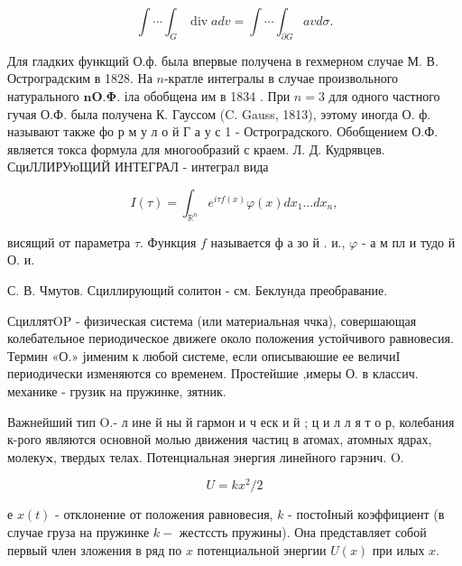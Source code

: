 \documentclass[10pt]{article}
\begin{document}
\[

\int \cdots \int_{G} \operatorname{div} a d v=\int \cdots \int_{\partial G} a v d \sigma .

\]



Для гладких функщий О.ф. была впервые получена в гехмерном случае М. В. Остроградским в 1828. На $n$-кратле интегралы в случае произвольного натурального $\boldsymbol{n} \mathbf{O} . \boldsymbol{\Phi}$. іла обобщена им в 1834 . При $n=3$ для одного частного гучая О.Ф. была получена К. Гауссом (C. Gauss, 1813), ээтому иногда О. ф. называют также фо р м у л о й Г а у с 1 - Остроградского. Обобщением О.Ф. является токса формула для многообразий с краем. Л. Д. Кудрявцев. СциЛЛИРУюЩИЙ ИНТЕГРАЛ - интеграл вида



\[

I(\tau)=\int_{\mathbb{R}^{n}} e^{i \tau f(x)} \varphi(x) d x_{1} \ldots d x_{n},

\]



висящий от параметра $\tau$. Функция $f$ называется ф а зо й . и., $\varphi$ - а м пл и тудо й О. и.



С. В. Чмутов. Сциллирующий солитон - см. Беклунда преобравание.



СциллятOP - физическая система (или материальная ччка), совершающая колебательное периодическое движеґе около положения устойчивого равновесия. Термин «О.» јименим к любой системе, если описываюшие ее величиI периодически изменяются со временем. Простейшие ,имеры О. в классич. механике - грузик на пружинке, зятник.



Важнейший тип O.- л ине й ны й гармон и ч еск и й ; ц и л л я т о р, колебания к-рого являются основной молью движения частиц в атомах, атомных ядрах, молеку$\mathbf{x}$, твердых телах. Потенциальная энергия линейного гарэнич. $\mathrm{O}$.



\[

U=k x^{2} / 2

\]



е $x(t)$ - отклонение от положения равновесия, $k$ - постоІный коэффициент (в случае груза на пружинке $k-$ жестссть пружины). Она представляет собой первый член зложения в ряд по $x$ потенциальной энергии $U(x)$ при илых $x$.
\end{document}
